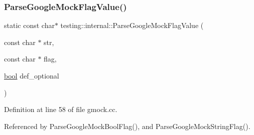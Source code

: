 \subsubsection{\texorpdfstring{Parse\+Google\+Mock\+Flag\+Value()}{ParseGoogleMockFlagValue()}}
{\footnotesize\ttfamily static const char$\ast$ testing\+::internal\+::\+Parse\+Google\+Mock\+Flag\+Value (\begin{DoxyParamCaption}\item[{const char $\ast$}]{str,  }\item[{const char $\ast$}]{flag,  }\item[{\hyperlink{classbool}{bool}}]{def\+\_\+optional }\end{DoxyParamCaption})\hspace{0.3cm}{\ttfamily [static]}}



Definition at line 58 of file gmock.\+cc.



Referenced by Parse\+Google\+Mock\+Bool\+Flag(), and Parse\+Google\+Mock\+String\+Flag().


